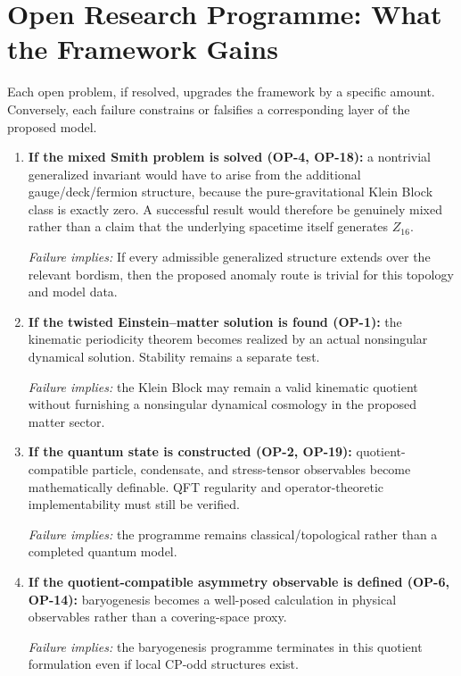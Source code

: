 \documentclass[11pt]{article}
\theoremstyle{canonmath}
\theoremstyle{canonpostulate}
\theoremstyle{canonclaim}
\def\mathbb#1{#1}%
\begin{document}
\section{Open Research Programme: What the Framework Gains}
\label{sec:programme}

Each open problem, if resolved, upgrades the framework by a specific amount. Conversely, each failure constrains or falsifies a corresponding layer of the proposed model.

\begin{enumerate}
\item \textbf{If the mixed Smith problem is solved (OP-4, OP-18):} a nontrivial generalized invariant would have to arise from the additional gauge/deck/fermion structure, because the pure-gravitational Klein Block class is exactly zero. A successful result would therefore be genuinely mixed rather than a claim that the underlying spacetime itself generates $\mathbb Z_{16}$.

\emph{Failure implies:} If every admissible generalized structure extends over the relevant bordism, then the proposed anomaly route is trivial for this topology and model data.

\item \textbf{If the twisted Einstein--matter solution is found (OP-1):} the kinematic periodicity theorem becomes realized by an actual nonsingular dynamical solution. Stability remains a separate test.

\emph{Failure implies:} the Klein Block may remain a valid kinematic quotient without furnishing a nonsingular dynamical cosmology in the proposed matter sector.

\item \textbf{If the quantum state is constructed (OP-2, OP-19):} quotient-compatible particle, condensate, and stress-tensor observables become mathematically definable. QFT regularity and operator-theoretic implementability must still be verified.

\emph{Failure implies:} the programme remains classical/topological rather than a completed quantum model.

\item \textbf{If the quotient-compatible asymmetry observable is defined (OP-6, OP-14):} baryogenesis becomes a well-posed calculation in physical observables rather than a covering-space proxy.

\emph{Failure implies:} the baryogenesis programme terminates in this quotient formulation even if local CP-odd structures exist.


\end{enumerate}
\end{document}
